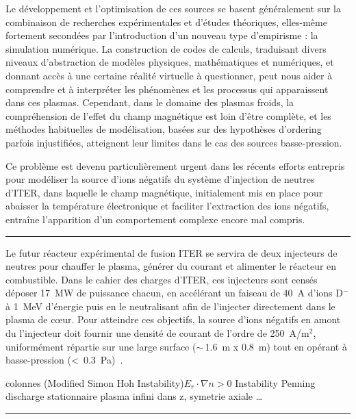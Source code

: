\begin{refsection}
Le développement et l'optimisation de ces sources se basent généralement sur la
combinaison de recherches expérimentales et d'études théoriques, elles-même
fortement secondées par l'introduction d'un nouveau type d'empirisme : la
simulation numérique.
La construction de codes de calculs, traduisant divers niveaux d'abstraction de
modèles physiques, mathématiques et numériques, et donnant accès à une
certaine réalité virtuelle à questionner, peut nous aider à
comprendre et à interpréter les phénomènes et les processus qui apparaissent dans ces
plasmas. Cependant, dans le domaine des plasmas froids, la compréhension de
l'effet du champ magnétique est loin d'être complète, et les méthodes
habituelles de modélisation, basées sur des hypothèses d'ordering parfois
injustifiées, atteignent leur limites dans le cas des sources basse-pression. 

Ce
problème est devenu particulièrement urgent dans les récents efforts entrepris pour modéliser
la source d'ions négatifs du système d'injection de neutres d'ITER, dans
laquelle le champ magnétique, initialement mis en place pour abaisser la
température électronique et faciliter l'extraction des ions négatifs, entraîne
l'apparition d'un comportement complexe encore mal compris.

\begin{center}
\rule{0.6\textwidth}{1pt}
\end{center}

Le futur réacteur expérimental de fusion ITER se servira de deux injecteurs de
neutres pour chauffer le plasma, générer du courant et alimenter le réacteur en
combustible. Dans le cahier des charges d'ITER, ces injecteurs
sont censés déposer 17~MW de puissance chacun, en accélérant un
faiseau de 40~A d'ions D$^-$ à 1~MeV d'énergie puis en le neutralisant afin de
l'injecter directement dans le plasma de c\oe ur. Pour atteindre ces objectifs,
la source d'ions négatifs en amont du l'injecteur doit fournir
une densité de courant de l'ordre de 250~A/m$^2$, uniformément répartie sur une
large surface ($\sim\,$1.6~m x 0.8~m) tout en opérant à basse-pression
(<~0.3~Pa)~\parencite{Hemsworth,SimoninHDR}.

colonnes
\parencite{RosenbluthSimon}
\parencite{Sakawa} (Modified Simon Hoh Instability)$E_r\cdot\nabla n > 0$
\parencite{Hoh} Instability Penning discharge
\parencite{Fruchtman} stationnaire
\parencite{Sternberg} plasma infini dans z, symetrie axiale \ldots 

\begin{center}
\rule{0.6\textwidth}{1pt}
\end{center}


\end{refsection}
